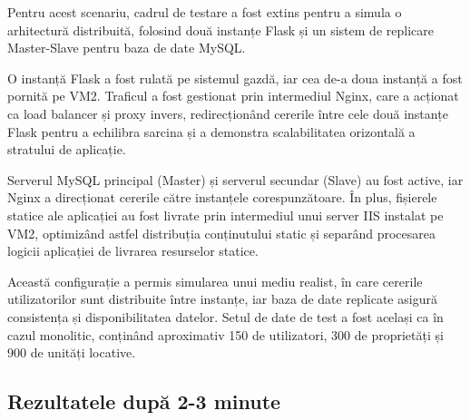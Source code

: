 \documentclass[12pt, a4paper, oneside, romanian]{teza-upb}
\begin{document}
Pentru acest scenariu, cadrul de testare a fost extins pentru a simula o arhitectură distribuită, folosind două instanțe Flask și un sistem de replicare Master-Slave pentru baza de date MySQL. 

O instanță Flask a fost rulată pe sistemul gazdă, iar cea de-a doua instanță a fost pornită pe VM2. Traficul a fost gestionat prin intermediul Nginx, care a acționat ca load balancer și proxy invers, redirecționând cererile între cele două instanțe Flask pentru a echilibra sarcina și a demonstra scalabilitatea orizontală a stratului de aplicație.

Serverul MySQL principal (Master) și serverul secundar (Slave) au fost active, iar Nginx a direcționat cererile către instanțele corespunzătoare. În plus, fișierele statice ale aplicației au fost livrate prin intermediul unui server IIS instalat pe VM2, optimizând astfel distribuția conținutului static și separând procesarea logicii aplicației de livrarea resurselor statice.

Această configurație a permis simularea unui mediu realist, în care cererile utilizatorilor sunt distribuite între instanțe, iar baza de date replicate asigură consistența și disponibilitatea datelor. Setul de date de test a fost același ca în cazul monolitic, conținând aproximativ 150 de utilizatori, 300 de proprietăți și 900 de unități locative.

\subsection*{Rezultatele după 2-3 minute}
\end{document}

